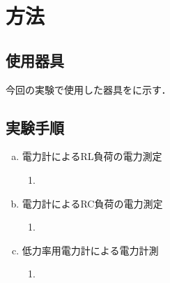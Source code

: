 \clearpage
\section{方法}
\subsection{使用器具}
今回の実験で使用した器具をに示す．

\subsection{実験手順}
\begin{enumerate}[a)]
\item 電力計によるRL負荷の電力測定
\begin{enumerate}[(1)]
	\item 
\end{enumerate}
\item 電力計によるRC負荷の電力測定
\begin{enumerate}[(1)]
	\item 
\end{enumerate}
\item 低力率用電力計による電力計測
\begin{enumerate}[(1)]
	\item 
\end{enumerate}
\end{enumerate}